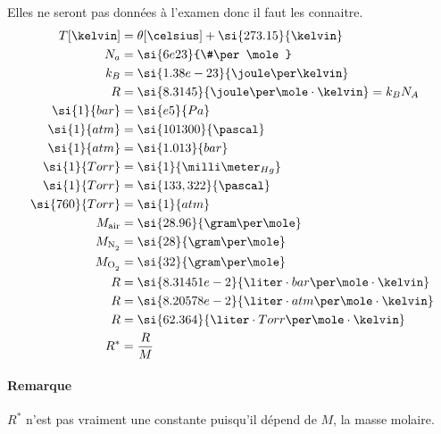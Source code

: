 Elles ne seront pas données à l'examen donc il faut les connaitre.
\begin{align*}
  T[\kelvin] & = \theta[\celsius] + \si{273.15}{\kelvin}\\
  N_a & = \si{6e23}{\#\per\mole}\\
  k_B & = \si{1.38e-23}{\joule\per\kelvin}\\
  R & = \si{8.3145}{\joule\per\mole\cdot\kelvin} = k_B N_A\\
  \si{1}{bar} & = \si{e5}{Pa}\\
  \si{1}{atm} & = \si{101300}{\pascal}\\
  \si{1}{atm} & = \si{1.013}{bar}\\
  \si{1}{Torr} & = \si{1}{\milli\meter_{Hg}}\\
  \si{1}{Torr} & = \si{133,322}{\pascal}\\
  \si{760}{Torr} & = \si{1}{atm}\\
  M_\mathrm{air} & = \si{28.96}{\gram\per\mole}\\
  M_\mathrm{\ce{N2}} & = \si{28}{\gram\per\mole}\\
  M_\mathrm{\ce{O2}} & = \si{32}{\gram\per\mole}\\
  R & = \si{8.31451e-2}{\liter\cdot bar\per\mole\cdot\kelvin}\\
  R & = \si{8.20578e-2}{\liter\cdot atm\per\mole\cdot\kelvin}\\
  R & = \si{62.364}{\liter\cdot Torr\per\mole\cdot\kelvin}\\
  R^* & = \frac{R}{M}
\end{align*}

\paragraph{Remarque}
$R^*$ n'est pas vraiment une constante puisqu'il dépend de $M$,
la masse molaire.


